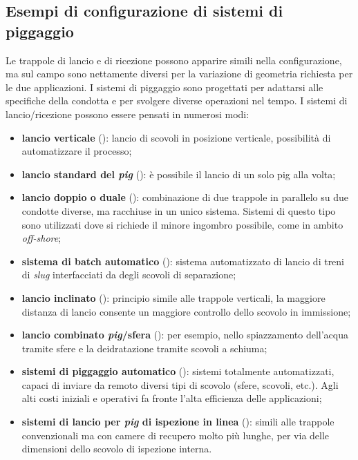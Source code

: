 \subsection{Esempi di configurazione di sistemi di piggaggio}
Le trappole di lancio e di ricezione possono apparire simili nella configurazione, ma sul campo sono nettamente diversi per la variazione di geometria richiesta per le due applicazioni. I sistemi di piggaggio sono progettati per adattarsi alle specifiche della condotta e per svolgere diverse operazioni nel tempo. I sistemi di lancio/ricezione possono essere pensati in numerosi modi:
\begin{itemize}
\item \textbf{lancio verticale} (): lancio di scovoli in posizione verticale, possibilità di automatizzare il processo;
\item \textbf{lancio standard del \textit{pig}} (): è possibile il lancio di un solo pig alla volta;
\item \textbf{lancio doppio o duale} (): combinazione di due trappole in parallelo su due condotte diverse, ma racchiuse in un unico sistema. Sistemi di questo tipo sono utilizzati dove si richiede il minore ingombro possibile, come in ambito \textit{off-shore};
\item \textbf{sistema di batch automatico} (): sistema automatizzato di lancio di treni di \textit{slug} interfacciati da degli scovoli di separazione;
\item \textbf{lancio inclinato} (): principio simile alle trappole verticali, la maggiore distanza di lancio consente un maggiore controllo dello scovolo in immissione;
\item \textbf{lancio combinato \textit{pig}/sfera} (): per esempio, nello spiazzamento dell'acqua tramite sfere e la deidratazione tramite scovoli a schiuma;
\item \textbf{sistemi di piggaggio automatico} (): sistemi totalmente automatizzati, capaci di inviare da remoto diversi tipi di scovolo (sfere, scovoli, etc.). Agli alti costi iniziali e operativi fa fronte l'alta efficienza delle applicazioni;
\item \textbf{sistemi di lancio per \textit{pig} di ispezione in linea} (): simili alle trappole convenzionali ma con camere di recupero molto più lunghe, per via delle dimensioni dello scovolo di ispezione interna.
\end{itemize}

